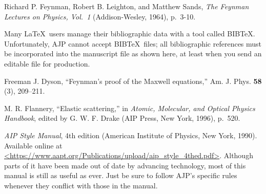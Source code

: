 \documentclass[prb,preprint]{revtex4-1}
\begin{document}
\begin{thebibliography}{99}
 Richard P. Feynman, Robert B. Leighton, and Matthew Sands, 
\textit{The Feynman Lectures on Physics, Vol.\ 1} (Addison-Wesley, 1964), p.~3-10.

 Many \LaTeX\ users manage their bibliographic data with 
a tool called BIB\TeX.  Unfortunately, AJP cannot accept BIB\TeX\ files; all 
bibliographic references must be incorporated into the manuscript file
as shown here, at least when you send an editable file for production.

 Freeman J. Dyson, ``Feynman's proof of the Maxwell equations,''
Am. J. Phys. \textbf{58} (3), 209--211.  

 M. R. Flannery, ``Elastic scattering,'' in 
\textit{Atomic, Molecular, and Optical Physics Handbook}, edited by
G. W. F. Drake (AIP Press, New York, 1996), p.~520.

 \textit{AIP Style Manual}, 4th edition (American 
Institute of Physics, New York, 1990). Available online at 
\url{<https://www.aapt.org/Publications/upload/aip_style_4thed.pdf>}. Although parts of 
it have been made out of date by advancing technology, most of this manual 
is still as useful as ever. Just be sure to follow AJP's specific rules
whenever they conflict with those in the manual.

\end{thebibliography}
\end{document}
